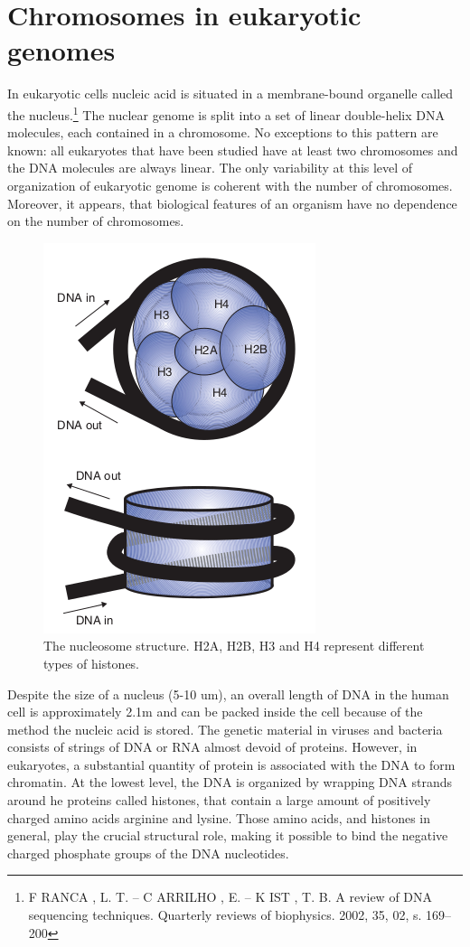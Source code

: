 \section{Chromosomes in eukaryotic genomes}

In eukaryotic cells nucleic acid is situated in a membrane-bound organelle called the nucleus.\footnote{F RANCA , L. T. – C ARRILHO , E. – K IST , T. B. A review of DNA sequencing techniques.
Quarterly reviews of biophysics. 2002, 35, 02, s. 169–200}  The nuclear genome is split into a set of linear double-helix DNA molecules, each contained in a chromosome. No exceptions to this pattern are known: all eukaryotes that have been studied have at least two chromosomes and the DNA molecules are always linear. The only variability at this level of organization of eukaryotic genome is coherent with the number of chromosomes. Moreover, it appears, that biological features of an organism have no dependence on the number of chromosomes. 

\begin{figure}[!ht]
	\centering
	\includegraphics[width=.5\textwidth]{figures/nucleoDetailed}
	\caption{The nucleosome structure. H2A, H2B, H3 and H4 represent different types of histones. \label{o:latex_friendly_zone}}
\end{figure}

Despite the size of a nucleus (5-10 um), an overall length of DNA in the human cell is approximately 2.1m and can be packed inside the cell because of the method the nucleic acid is stored. The genetic material in viruses and bacteria consists of strings of DNA or RNA almost devoid of proteins. However, in eukaryotes, a substantial quantity of protein is associated with the DNA to form chromatin. At the lowest level, the DNA is organized by wrapping DNA strands around he proteins called histones, that contain a large amount of positively charged amino acids arginine and lysine. Those amino acids, and histones in general, play the crucial structural role, making it possible to bind the negative charged phosphate groups of the DNA nucleotides.

